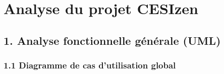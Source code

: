 \documentclass[
]{article}
\author{}
\date{}
\begin{document}
\section{Analyse du projet CESIzen}\label{analyse-du-projet-cesizen}

\subsection{1. Analyse fonctionnelle générale
(UML)}\label{analyse-fonctionnelle-guxe9nuxe9rale-uml}

\subsubsection{1.1 Diagramme de cas d’utilisation
global}\label{diagramme-de-cas-dutilisation-global}
\end{document}
